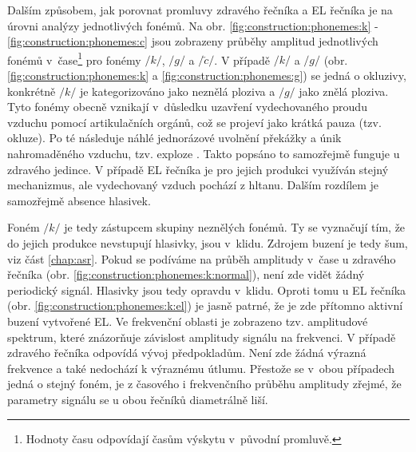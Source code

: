 Dalším způsobem, jak porovnat promluvy zdravého řečníka  a EL řečníka je na úrovni analýzy jednotlivých fonémů.
Na obr. \ref{fig:construction:phonemes:k} - \ref{fig:construction:phonemes:c} jsou zobrazeny průběhy amplitud jednotlivých fonémů v~čase\footnote{Hodnoty času odpovídají časům výskytu v~původní promluvě.} pro fonémy $/k/$, $/g/$ a $/\check{c}/$.
V případě $/k/$ a $/g/$ (obr. \ref{fig:construction:phonemes:k} a \ref{fig:construction:phonemes:g}) se jedná o okluzivy, konkrétně $/k/$ je kategorizováno jako neznělá ploziva a $/g/$ jako znělá ploziva.
Tyto fonémy obecně vznikají v~důsledku uzavření vydechovaného proudu vzduchu pomocí artikulačních orgánů, což se projeví jako krátká pauza (tzv. okluze).
Po té následuje náhlé jednorázové uvolnění překážky a únik nahromaděného vzduchu, tzv. exploze \cite{Psutka2006}.
Takto popsáno to samozřejmě funguje u zdravého jedince.
V případě EL řečníka je pro jejich produkci využíván stejný mechanizmus, ale vydechovaný vzduch pochází z hltanu.
Dalším rozdílem je samozřejmě absence hlasivek.

Foném $/k/$ je tedy zástupcem skupiny neznělých fonémů.
Ty se vyznačují tím, že do jejich produkce nevstupují hlasivky, jsou v~klidu.
Zdrojem buzení je tedy šum, viz část \ref{chap:asr}.
Pokud se podíváme na průběh amplitudy v~čase u zdravého řečníka (obr. \ref{fig:construction:phonemes:k:normal}), není zde vidět žádný periodický signál.
Hlasivky jsou tedy opravdu v~klidu.
Oproti tomu u EL řečníka (obr. \ref{fig:construction:phonemes:k:el}) je jasně patrné, že je zde přítomno aktivní buzení vytvořené EL.
Ve frekvenční oblasti je zobrazeno tzv. amplitudové spektrum, které znázorňuje závislost amplitudy signálu na frekvenci.
V případě zdravého řečníka odpovídá vývoj předpokladům.
Není zde žádná výrazná frekvence a také nedochází k výraznému útlumu.
Přestože se v~obou případech jedná o stejný foném, je z časového i frekvenčního průběhu amplitudy zřejmé, že parametry signálu se u obou řečníků diametrálně liší.

